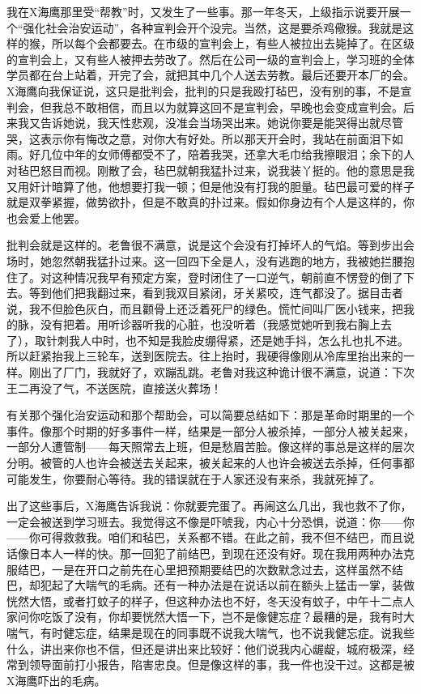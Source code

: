 我在X海鹰那里受“帮教”时，又发生了一些事。那一年冬天，上级指示说要开展一个“强化社会治安运动”，各种宣判会开个没完。当然，这是要杀鸡儆猴。我就是这样的猴，所以每个会都要去。在市级的宣判会上，有些人被拉出去毙掉了。在区级的宣判会上，又有些人被押去劳改了。然后在公司一级的宣判会上，学习班的全体学员都在台上站着，开完了会，就把其中几个人送去劳教。最后还要开本厂的会。X海鹰向我保证说，这只是批判会，批判的只是我殴打毡巴，没有别的事，不是宣判会，但我总不敢相信，而且以为就算这回不是宣判会，早晚也会变成宣判会。后来我又告诉她说，我天性悲观，没准会当场哭出来。她说你要是能哭得出就尽管哭，这表示你有悔改之意，对你大有好处。所以那天开会时，我站在前面泪下如雨。好几位中年的女师傅都受不了，陪着我哭，还拿大毛巾给我擦眼泪；余下的人对毡巴怒目而视。刚散了会，毡巴就朝我猛扑过来，说我装丫挺的。他的意思是我又用奸计暗算了他，他想要打我一顿；但是他没有打我的胆量。毡巴最可爱的样子就是双拳紧握，做势欲扑，但是不敢真的扑过来。假如你身边有个人是这样的，你也会爱上他罢。 

批判会就是这样的。老鲁很不满意，说是这个会没有打掉坏人的气焰。等到步出会场时，她忽然朝我猛扑过来。这一回四下全是人，没有逃跑的地方，我被她拦腰抱住了。对这种情况我早有预定方案，登时闭住了一口逆气，朝前直不愣登的倒了下去。等到他们把我翻过来，看到我双目紧闭，牙关紧咬，连气都没了。据目击者说，我不但脸色灰白，而且颧骨上还泛着死尸的绿色。慌忙间叫厂医小钱来，把我的脉，没有把着。用听诊器听我的心脏，也没听着（我感觉她听到我右胸上去了），取针刺我人中时，也不知是我脸皮绷得紧，还是她手抖，怎么扎也扎不进。所以赶紧抬我上三轮车，送到医院去。往上抬时，我硬得像刚从冷库里抬出来的一样。刚出了厂门，我就好了，欢蹦乱跳。老鲁对我这种诡计很不满意，说道：下次王二再没了气，不送医院，直接送火葬场！ 

有关那个强化治安运动和那个帮助会，可以简要总结如下：那是革命时期里的一个事件。像那个时期的好多事件一样，结果是一部分人被杀掉，一部分人被关起来，一部分人遭管制——每天照常去上班，但是愁眉苦脸。像这样的事总是这样的层次分明。被管的人也许会被送去关起来，被关起来的人也许会被送去杀掉，任何事都可能发生，你要耐心等待。我的错误就在于人家还没有来杀，我就死掉了。 

出了这些事后，X海鹰告诉我说：你就要完蛋了。再闹这么几出，我也救不了你，一定会被送到学习班去。我觉得这不像是吓唬我，内心十分恐惧，说道：你——你——你可得救救我。咱们和毡巴，关系都不错。在此之前，我不但不结巴，而且说话像日本人一样的快。那一回犯了前结巴，到现在还没有好。现在我用两种办法克服结巴，一是在开口之前先在心里把预期要结巴的次数默念过去，这样虽然不结巴，却犯起了大喘气的毛病。还有一种办法是在说话以前在额头上猛击一掌，装做恍然大悟，或者打蚊子的样子，但这种办法也不好，冬天没有蚊子，中午十二点人家问你吃饭了没有，你却要恍然大悟一下，岂不是像健忘症？最糟的是，我有时大喘气，有时健忘症，结果是现在的同事既不说我大喘气，也不说我健忘症。说我些什么，讲出来你也不信，但还是讲出来比较好：他们说我内心龌龊，城府极深，经常到领导面前打小报告，陷害忠良。但是像这样的事，我一件也没干过。这都是被X海鹰吓出的毛病。 

